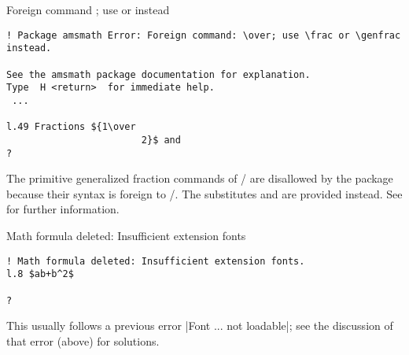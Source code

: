 \documentclass[leqno,titlepage,openany]{amsldoc}
\begin{document}
\begin{error}{Foreign command \over; use \frac or \genfrac instead}
\errexa
\begin{verbatim}
! Package amsmath Error: Foreign command: \over; use \frac or \genfrac instead.

See the amsmath package documentation for explanation.
Type  H <return>  for immediate help.
 ...

l.49 Fractions ${1\over
                        2}$ and
?
\end{verbatim}
\errexpl
The primitive generalized fraction commands of \tex/ are disallowed by
the  package because their syntax is foreign to \latex/.
The substitutes  and  are provided instead.
See  for further information.
\end{error}

\begin{error}{Math formula deleted: Insufficient extension fonts}
\errexa
\begin{verbatim}
! Math formula deleted: Insufficient extension fonts.
l.8 $ab+b^2$

?
\end{verbatim}
\errexpl
This usually follows a previous error |Font ... not loadable|; see the
discussion of that error (above) for solutions.
\end{error}
\end{document}
